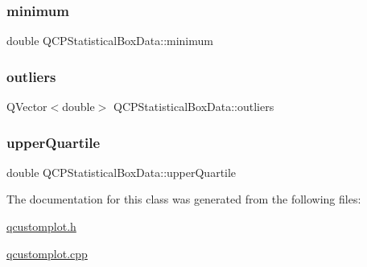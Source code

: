 \subsubsection{\texorpdfstring{minimum}{minimum}}
{\footnotesize\ttfamily double Q\+C\+P\+Statistical\+Box\+Data\+::minimum}

\mbox{\label{class_q_c_p_statistical_box_data_abaa27539fbd941d3f1eb8169e881e308}} 
\subsubsection{\texorpdfstring{outliers}{outliers}}
{\footnotesize\ttfamily Q\+Vector$<$double$>$ Q\+C\+P\+Statistical\+Box\+Data\+::outliers}

\mbox{\label{class_q_c_p_statistical_box_data_a5604dfe04b103e5ac73ce7895b46303b}} 
\subsubsection{\texorpdfstring{upper\+Quartile}{upperQuartile}}
{\footnotesize\ttfamily double Q\+C\+P\+Statistical\+Box\+Data\+::upper\+Quartile}



The documentation for this class was generated from the following files\+:\begin{DoxyCompactItemize}
\item 
\hyperlink{qcustomplot_8h}{qcustomplot.\+h}\item 
\hyperlink{qcustomplot_8cpp}{qcustomplot.\+cpp}\end{DoxyCompactItemize}

